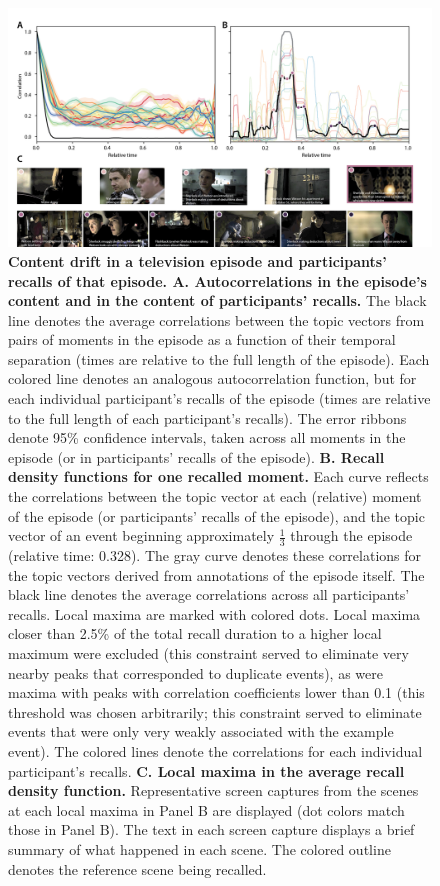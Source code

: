 \documentclass{article}
\begin{document}
\begin{figure}[tp] \centering \includegraphics[width=\textwidth]{figs/reinstatement} \caption{\textbf{Content drift in a television episode and participants' recalls of that episode.  A.  Autocorrelations in the episode's content and in the content of participants' recalls.}  The black line denotes the average correlations between the topic vectors from pairs of moments in the episode as a function of their temporal separation (times are relative to the full length of the episode).  Each colored line denotes an analogous autocorrelation function, but for each individual participant's recalls of the episode (times are relative to the full length of each participant's recalls).  The error ribbons denote 95\% confidence intervals, taken across all moments in the episode (or in participants' recalls of the episode).  \textbf{B. Recall density functions for one recalled moment.} Each curve reflects the correlations between the topic vector at each (relative) moment of the episode (or participants' recalls of the episode), and the topic vector of an event beginning approximately $\frac{1}{3}$ through the episode (relative time: 0.328).  The gray curve denotes these correlations for the topic vectors derived from annotations of the episode itself. The black line denotes the average correlations across all participants' recalls.  Local maxima are marked with colored dots.  Local maxima closer than 2.5\% of the total recall duration to a higher local maximum were excluded (this constraint served to eliminate very nearby peaks that corresponded to duplicate events), as were maxima with peaks with correlation coefficients lower than 0.1 (this threshold was chosen arbitrarily; this constraint served to eliminate events that were only very weakly associated with the example event).   The colored lines denote the correlations for each individual participant's recalls.  \textbf{C. Local maxima in the average recall density function.}  Representative screen captures from the scenes at each local maxima in Panel B are displayed (dot colors match those in Panel B).  The text in each screen capture displays a brief summary of what happened in each scene. The colored outline denotes the reference scene being recalled.}

\end{figure}
\end{document}

